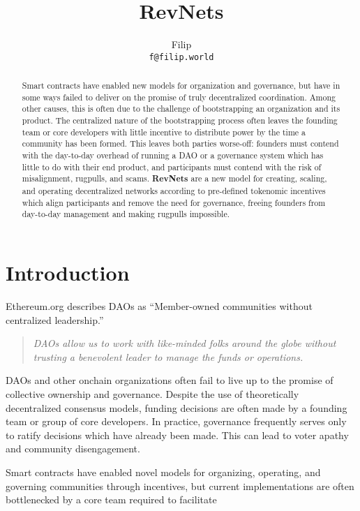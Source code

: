 \documentclass{article}
\title{RevNets}
\author{Filip\\ \texttt{f@filip.world}}
\begin{document}
\maketitle

\begin{abstract}
  Smart contracts have enabled new models for organization and governance, but have in some ways failed to deliver on the promise of truly decentralized coordination. Among other causes, this is often due to the challenge of bootstrapping an organization and its product. The centralized nature of the bootstrapping process often leaves the founding team or core developers with little incentive to distribute power by the time a community has been formed. This leaves both parties worse-off: founders must contend with the day-to-day overhead of running a DAO or a governance system which has little to do with their end product, and participants must contend with the risk of misalignment, rugpulls, and scams. \textbf{RevNets} are a new model for creating, scaling, and operating decentralized networks according to pre-defined tokenomic incentives which align participants and remove the need for governance, freeing founders from day-to-day management and making rugpulls impossible.
\end{abstract}

\section{Introduction}

Ethereum.org\cite{daos} describes DAOs as ``Member-owned communities without centralized leadership.''

\begin{quote}
  \textit{DAOs allow us to work with like-minded folks around the globe without trusting a benevolent leader to manage the funds or operations.}
\end{quote}

DAOs and other onchain organizations often fail to live up to the promise of collective ownership and governance. Despite the use of theoretically decentralized consensus models, funding decisions are often made by a founding team or group of core developers. In practice, governance frequently serves only to ratify decisions which have already been made. This can lead to voter apathy and community disengagement.

Smart contracts have enabled novel models for organizing, operating, and governing communities through incentives, but current implementations are often bottlenecked by a core team required to facilitate
\end{document}
